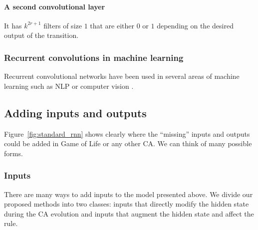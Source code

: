 \paragraph{A second convolutional layer} It has $k^{2r + 1}$ filters of size $1$ that
are either $0$ or $1$ depending on the desired output of the transition.

\subsubsection{Recurrent convolutions in machine learning}

Recurrent convolutional networks have been used in several areas of machine
learning such as NLP or computer vision
\parencite{pinheiroRecurrentConvolutionalNeural2014,
  laiRecurrentConvolutionalNeural2015}.

\subsection{Adding inputs and outputs\label{sec:adding-inputs-outp}}

Figure~\ref{fig:standard_rnn} shows clearly where the ``missing'' inputs and
outputs could be added in Game of Life or any other CA\@. We can think of many
possible forms.

\subsubsection{Inputs}
There are many ways to add inputs to the model presented above. We divide our
proposed methods into two classes: inputs that directly modify the hidden state
during the CA evolution and inputs that augment the hidden state and affect the
rule.

